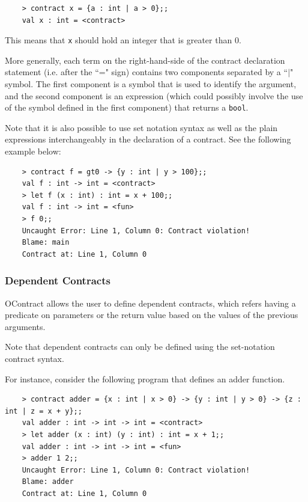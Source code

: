 \documentclass[a4paper]{article}
\begin{document}
\begin{verbatim}
    > contract x = {a : int | a > 0};;
    val x : int = <contract>
\end{verbatim}

This means that \texttt{x} should hold an integer that is greater than 0.

More generally, each term on the right-hand-side of the contract declaration statement (i.e. after the ``=" sign) contains two components separated by a ``$\vert$" symbol.
The first component is a symbol that is used to identify the argument, and the second component is an expression (which could possibly involve the use of the symbol defined in the first component) that returns a \texttt{bool}.

Note that it is also possible to use set notation syntax as well as the plain expressions interchangeably in the declaration of a contract.
See the following example below:

\begin{verbatim}
    > contract f = gt0 -> {y : int | y > 100};;
    val f : int -> int = <contract>
    > let f (x : int) : int = x + 100;;
    val f : int -> int = <fun>
    > f 0;;
    Uncaught Error: Line 1, Column 0: Contract violation!
    Blame: main
    Contract at: Line 1, Column 0
\end{verbatim}

\subsubsection{Dependent Contracts}

OContract allows the user to define dependent contracts, which refers having a predicate on parameters or the return value based on the values of the previous arguments.

Note that dependent contracts can only be defined using the set-notation contract syntax.

For instance, consider the following program that defines an adder function.

\begin{verbatim}
    > contract adder = {x : int | x > 0} -> {y : int | y > 0} -> {z : int | z = x + y};;
    val adder : int -> int -> int = <contract>
    > let adder (x : int) (y : int) : int = x + 1;;
    val adder : int -> int -> int = <fun>
    > adder 1 2;;
    Uncaught Error: Line 1, Column 0: Contract violation!
    Blame: adder
    Contract at: Line 1, Column 0
\end{verbatim}
\end{document}
